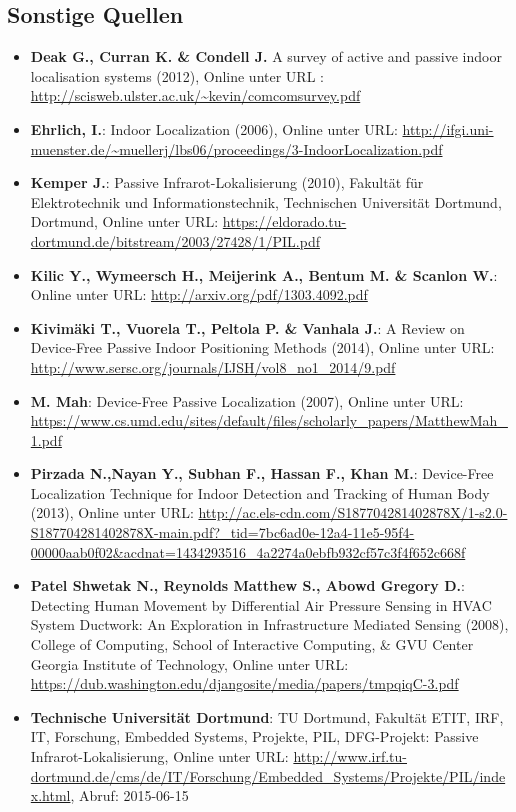 \subsection*{Sonstige Quellen}
\begin{itemize}[leftmargin=*]
\item[] \textbf{Deak G., Curran K. \& Condell J.} A survey of active and passive indoor localisation systems (2012), Online unter URL : \url{http://scisweb.ulster.ac.uk/~kevin/comcomsurvey.pdf}
\item[] \textbf{Ehrlich, I.}: Indoor Localization (2006), Online unter URL: \url{http://ifgi.uni-muenster.de/~muellerj/lbs06/proceedings/3-IndoorLocalization.pdf}
\item[] \textbf{Kemper J.}: Passive Infrarot-Lokalisierung (2010), Fakultät für Elektrotechnik und Informationstechnik, Technischen Universität Dortmund, Dortmund, Online unter URL: \url{https://eldorado.tu-dortmund.de/bitstream/2003/27428/1/PIL.pdf}
\item[] \textbf{Kilic Y., Wymeersch H., Meijerink A., Bentum M. \& Scanlon W.}: Online unter URL: \url{http://arxiv.org/pdf/1303.4092.pdf}
\item[] \textbf{Kivimäki T., Vuorela T., Peltola P. \& Vanhala J.}: A Review on Device-Free Passive Indoor Positioning Methods (2014), Online unter URL: \url{http://www.sersc.org/journals/IJSH/vol8_no1_2014/9.pdf}
\item[] \textbf{M. Mah}: Device-Free Passive Localization (2007), Online unter URL: \url{https://www.cs.umd.edu/sites/default/files/scholarly_papers/MatthewMah_1.pdf}
\item[] \textbf{Pirzada N.,Nayan Y., Subhan F., Hassan F., Khan M.}: Device-Free Localization Technique for Indoor Detection and Tracking of Human Body (2013), Online unter URL: \url{http://ac.els-cdn.com/S187704281402878X/1-s2.0-S187704281402878X-main.pdf?_tid=7bc6ad0e-12a4-11e5-95f4-00000aab0f02&acdnat=1434293516_4a2274a0ebfb932cf57c3f4f652c668f}
\item[] \textbf{Patel Shwetak N., Reynolds Matthew S., Abowd Gregory D.}: Detecting Human Movement by Differential Air
Pressure Sensing in HVAC System Ductwork: An Exploration in Infrastructure Mediated Sensing (2008), College of Computing, School of Interactive Computing, \& GVU Center Georgia Institute of Technology, Online unter URL: \url{https://dub.washington.edu/djangosite/media/papers/tmpqiqC-3.pdf}
\item[] \textbf{Technische Universität Dortmund}: TU Dortmund, Fakultät ETIT, IRF, IT, Forschung, Embedded Systems,  Projekte, PIL, DFG-Projekt: Passive Infrarot-Lokalisierung, Online unter URL: \url{http://www.irf.tu-dortmund.de/cms/de/IT/Forschung/Embedded_Systems/Projekte/PIL/index.html}, Abruf: 2015-06-15
\end{itemize}